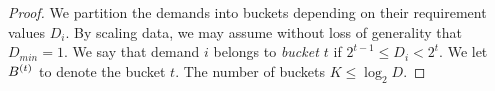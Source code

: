 \begin{proof}
%	
%	
%	
%	
%	
	We partition the demands into buckets depending on their requirement values $D_i$. By scaling data, we may assume without loss of generality that $D_{min} = 1$. 
	We say that demand $i$ belongs to \emph{bucket $t$} if $2^{t-1} \leq D_i < 2^t$. We let $B^{(t)}$ to denote the bucket $t$. The number of buckets $K \leq \log_2 D$.



\end{proof}
